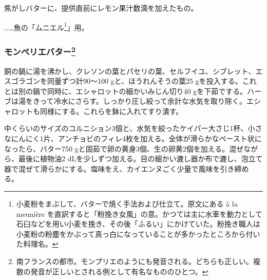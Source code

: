 \begin{recette}


焦がしバターに、提供直前にレモン果汁数滴を加えたもの。

\ldots{}\ldots{}魚の「ムニエル\footnote{小麦粉をまぶして、バターで焼く手法および仕立て。原文にある
  à la meunière
  を直訳すると「粉挽き女風」の意。かつては主に水車を動力として石臼などを用い小麦を挽き、その後「ふるい」にかけていた。粉挽き職人は小麦粉の粉塵をかぶって真っ白になっていることが多かったところから付いた料理名。}」用。

\hypertarget{beurre-de-montpellier}{%
\subsubsection[モンペリエバター]{\texorpdfstring{モンペリエバター\footnote{南フランスの都市。モンプリエのようにも発音される。どちらも正しい。複数の発音が正しいとされる例として有名なもののひとつ。}}{モンペリエバター}}\label{beurre-de-montpellier}}



銅の鍋に湯を沸かし、クレソンの葉とパセリの葉、セルフイユ、シブレット、エスゴラゴンを同量ずつ計90〜100
gと、ほうれんそうの葉25
gを投入する。これとは別の鍋で同時に、エシャロットの細かいみじん切り40
gを下茹でする。ハーブは湯をきって冷水にさらす。しっかり圧し絞って余計な水気を取り除く。エシャロットも同様にする。これらを鉢に入れてすり潰す。

中くらいのサイズのコルニション3個と、水気を絞ったケイパー大さじ1杯、小さなにんにく1片、アンチョビのフィレ4枚を加える。全体が滑らかなペースト状になったら、バター750
gと固茹で卵の黄身3個、生の卵黄2個を加える。混ぜながら、最後に植物油2
dLを少しずつ加える。目の細かい漉し器か布で漉し、泡立て器で混ぜて滑らかにする。塩味をえ、カイエンヌごく少量で風味を引き締める。


\end{recette}
